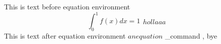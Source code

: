 This is text before equation environment
\begin{equation}
    \int_0^1 f(x)dx = 1
    \begin{split}
        hollaaa
        \begin{array}{cc}
        \end{array}
    \end{split}
\end{equation}
This is text after equation environment $an equation$  \a_command{}  , bye %
